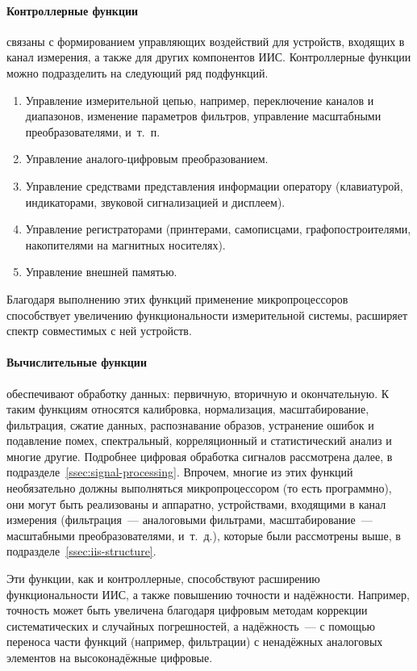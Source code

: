 \documentclass[a4paper, 14pt, titlepage]{extarticle}
\begin{document}
  \paragraph{Контроллерные функции} связаны с формированием управляющих воздействий для устройств,
  входящих в канал измерения, а также для других компонентов ИИС. Контроллерные функции можно
  подразделить на следующий ряд подфункций.
  \begin{enumerate}
    \item Управление измерительной цепью, например, переключение каналов и диапазонов, изменение
      параметров фильтров, управление масштабными преобразователями, и~т.~п.
    \item Управление аналого-цифровым преобразованием.
    \item Управление средствами представления информации оператору (клавиатурой, индикаторами,
      звуковой сигнализацией и дисплеем).
    \item Управление регистраторами (принтерами, самописцами, графопостроителями,
      накопителями на магнитных носителях).
    \item Управление внешней памятью.
  \end{enumerate}

  Благодаря выполнению этих функций применение микропроцессоров способствует увеличению
  функциональности измерительной системы, расширяет спектр совместимых с ней устройств.

  \paragraph{Вычислительные функции} обеспечивают обработку данных: первичную, вторичную и
  окончательную. К таким функциям относятся калибровка, нормализация, масштабирование, фильтрация,
  сжатие данных, распознавание образов, устранение ошибок и подавление помех, спектральный,
  корреляционный и статистический анализ и многие другие. Подробнее цифровая обработка сигналов
  рассмотрена далее, в подразделе~\ref{ssec:signal-processing}. Впрочем, многие из этих функций
  необязательно должны выполняться микропроцессором (то есть программно), они могут быть реализованы
  и аппаратно, устройствами, входящими в канал измерения (фильтрация~--- аналоговыми фильтрами,
  масштабирование~--- масштабными преобразователями, и~т.~д.), которые были рассмотрены выше, в
  подразделе~\ref{ssec:iis-structure}.

  Эти функции, как и контроллерные, способствуют расширению функциональности ИИС, а также повышению
  точности и надёжности. Например, точность может быть увеличена благодаря цифровым методам
  коррекции систематических и случайных погрешностей, а надёжность~--- с помощью переноса части
  функций (например, фильтрации) с ненадёжных аналоговых элементов на высоконадёжные цифровые.
\end{document}
